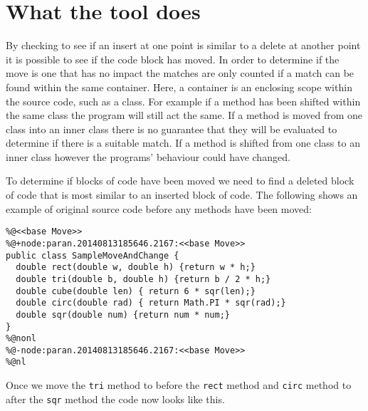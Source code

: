 % 

\section{What the tool does}

By checking to see if an insert at one point is similar to a delete at another point it is possible to see if the code block has moved. In order to determine if the move is one that has no impact the matches are only counted if a match can be found within the same container.  Here, a container is an enclosing scope within the source code, such as a class. For example if a method has been shifted within the same class the program will still act the same.  If a method is moved from one class into an inner class there is no guarantee that they will be evaluated to determine if there is a suitable match.  If a method is shifted from one class to an inner class however the programs' behaviour could have changed.

To determine if blocks of code have been moved we need to find a deleted block of code that is most similar to an inserted block of code.  The following shows an example of original source code before any methods have been moved: 

\begin{lstlisting}
%@<<base Move>>
%@+node:paran.20140813185646.2167:<<base Move>>
public class SampleMoveAndChange {
  double rect(double w, double h) {return w * h;}
  double tri(double b, double h) {return b / 2 * h;}
  double cube(double len) { return 6 * sqr(len);}
  double circ(double rad) { return Math.PI * sqr(rad);}
  double sqr(double num) {return num * num;}
}
%@nonl
%@-node:paran.20140813185646.2167:<<base Move>>
%@nl
\end{lstlisting}

Once we move the \lstinline{tri} method to before the \lstinline{rect} method and \lstinline{circ} method to after the \lstinline{sqr} method the code now looks like this.

